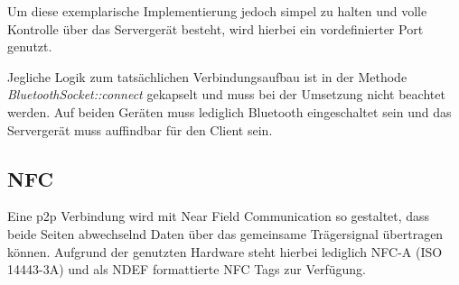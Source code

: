         Um diese exemplarische Implementierung jedoch simpel zu halten und volle Kontrolle über das Servergerät besteht, wird hierbei ein vordefinierter Port genutzt.

         Jegliche Logik zum tatsächlichen Verbindungsaufbau ist in der Methode {\it BluetoothSocket::connect} gekapselt und muss bei der Umsetzung nicht beachtet werden. Auf beiden Geräten muss lediglich Bluetooth eingeschaltet sein und das Servergerät muss auffindbar für den Client sein.
         
    \subsection{NFC}
        Eine p2p Verbindung wird mit Near Field Communication so gestaltet, dass beide Seiten abwechselnd Daten über das gemeinsame Trägersignal übertragen können.  Aufgrund der genutzten Hardware steht hierbei lediglich NFC-A (ISO 14443-3A) und als NDEF formattierte NFC Tags zur Verfügung.
        
